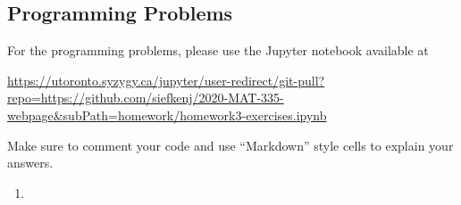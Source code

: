 \documentclass[letter]{article}
\begin{document}
	\subsection*{Programming Problems}
	For the programming problems, please use the Jupyter notebook available at

	\url{https://utoronto.syzygy.ca/jupyter/user-redirect/git-pull?repo=https://github.com/siefkenj/2020-MAT-335-webpage&subPath=homework/homework3-exercises.ipynb}

	Make sure to comment your code and use ``Markdown'' style cells to explain your answers.

	\begin{enumerate}
		\item 
	\end{enumerate}
\end{document}
